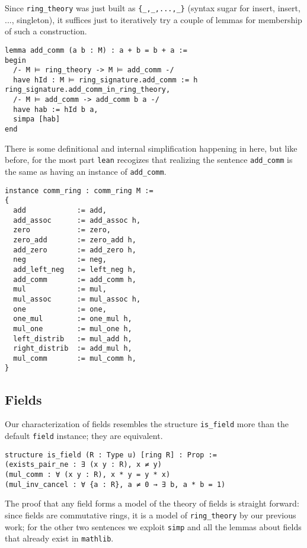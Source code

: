Since \texttt{ring\_theory} was just built as
\texttt{\{\_,\_,...,\_\}} (syntax sugar for
insert, insert, ..., singleton), it suffices just to iteratively
try a couple of lemmas for membership of such a construction.

\begin{lstlisting}
lemma add_comm (a b : M) : a + b = b + a :=
begin
  /- M ⊨ ring_theory -> M ⊨ add_comm -/
  have hId : M ⊨ ring_signature.add_comm := h ring_signature.add_comm_in_ring_theory,
  /- M ⊨ add_comm -> add_comm b a -/
  have hab := hId b a,
  simpa [hab]
end\end{lstlisting}

There is some definitional and internal simplification happening in here,
but like before, for the most part \texttt{lean} recogizes that
realizing the sentence \texttt{add\_comm} is the same as having
an instance of \texttt{add\_comm}.

\begin{lstlisting}
instance comm_ring : comm_ring M :=
{
  add            := add,
  add_assoc      := add_assoc h,
  zero           := zero,
  zero_add       := zero_add h,
  add_zero       := add_zero h,
  neg            := neg,
  add_left_neg   := left_neg h,
  add_comm       := add_comm h,
  mul            := mul,
  mul_assoc      := mul_assoc h,
  one            := one,
  one_mul        := one_mul h,
  mul_one        := mul_one h,
  left_distrib   := mul_add h,
  right_distrib  := add_mul h,
  mul_comm       := mul_comm h,
}\end{lstlisting}

\subsection{Fields}

Our characterization of fields resembles the structure \texttt{is\_field}
more than the default \texttt{field} instance;
they are equivalent.

\begin{lstlisting}
structure is_field (R : Type u) [ring R] : Prop :=
(exists_pair_ne : ∃ (x y : R), x ≠ y)
(mul_comm : ∀ (x y : R), x * y = y * x)
(mul_inv_cancel : ∀ {a : R}, a ≠ 0 → ∃ b, a * b = 1)\end{lstlisting}

The proof that any field forms a model of the theory of fields is straight forward:
since fields are commutative rings, it is a model of \texttt{ring\_theory}
by our previous work; for the other two sentences we exploit \texttt{simp}
and all the lemmas about fields that already exist in \texttt{mathlib}.

